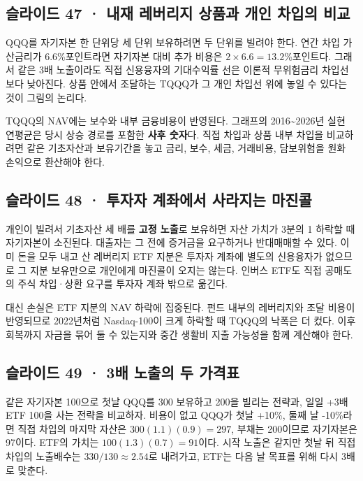 \documentclass[11pt,a4paper]{article}
\begin{document}
\subsection{슬라이드 47 · 내재 레버리지 상품과 개인 차입의 비교}
QQQ를 자기자본 한 단위당 세 단위 보유하려면 두 단위를 빌려야 한다. 연간 차입 가산금리가 6.6\%포인트라면 자기자본 대비 추가 비용은 $2\times6.6=13.2$\%포인트다. 그래서 같은 3배 노출이라도 직접 신용융자의 기대수익률 선은 이론적 무위험금리 차입선보다 낮아진다. 상품 안에서 조달하는 TQQQ가 그 개인 차입선 위에 놓일 수 있다는 것이 그림의 논리다.\par

TQQQ의 NAV에는 보수와 내부 금융비용이 반영된다. 그래프의 2016\~{}2026년 실현 연평균은 당시 상승 경로를 포함한 \textbf{사후 숫자}다. 직접 차입과 상품 내부 차입을 비교하려면 같은 기초자산과 보유기간을 놓고 금리, 보수, 세금, 거래비용, 담보위험을 원화 손익으로 환산해야 한다.\par

\subsection{슬라이드 48 · 투자자 계좌에서 사라지는 마진콜}
개인이 빌려서 기초자산 세 배를 \textbf{고정 노출}로 보유하면 자산 가치가 3분의 1 하락할 때 자기자본이 소진된다. 대출자는 그 전에 증거금을 요구하거나 반대매매할 수 있다. 이미 돈을 모두 내고 산 레버리지 ETF 지분은 투자자 계좌에 별도의 신용융자가 없으므로 그 지분 보유만으로 개인에게 마진콜이 오지는 않는다. 인버스 ETF도 직접 공매도의 주식 차입·상환 요구를 투자자 계좌 밖으로 옮긴다.\par

대신 손실은 ETF 지분의 NAV 하락에 집중된다. 펀드 내부의 레버리지와 조달 비용이 반영되므로 2022년처럼 Nasdaq-100이 크게 하락할 때 TQQQ의 낙폭은 더 컸다. 이후 회복까지 자금을 묶어 둘 수 있는지와 중간 생활비 지출 가능성을 함께 계산해야 한다.\par

\subsection{슬라이드 49 · 3배 노출의 두 가격표}
같은 자기자본 100으로 첫날 QQQ를 300 보유하고 200을 빌리는 전략과, 일일 +3배 ETF 100을 사는 전략을 비교하자. 비용이 없고 QQQ가 첫날 +10\%, 둘째 날 -10\%라면 직접 차입의 마지막 자산은 $300(1.1)(0.9)=297$, 부채는 200이므로 자기자본은 97이다. ETF의 가치는 $100(1.3)(0.7)=91$이다. 시작 노출은 같지만 첫날 뒤 직접 차입의 노출배수는 $330/130\approx2.54$로 내려가고, ETF는 다음 날 목표를 위해 다시 3배로 맞춘다.\par
\end{document}
